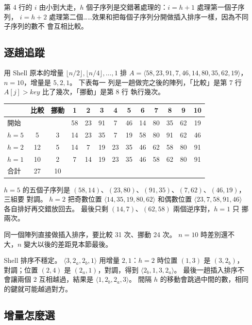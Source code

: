 第 4 行的 $i$ 由小到大走，$h$ 個子序列是交錯著處理的：$i = h + 1$ 處理第一個子序列，
$i = h + 2$ 處理第二個……效果和把每個子序列分開做插入排序一樣，因為不同子序列的數不
會互相比較。

\subsection{逐趟追蹤}

用 Shell 原本的增量 $\lfloor n/2 \rfloor, \lfloor n/4 \rfloor, \ldots, 1$ 排 $A = \langle
58, 23, 91, 7, 46, 14, 80, 35, 62, 19 \rangle$，$n = 10$，增量是 $5, 2, 1$。 下表每一
列是一趟做完之後的陣列，「比較」是第 7 行 $A[j] > \mathit{key}$ 比了幾次，「挪動」是第 8 行
執行幾次。

\begin{center}
\begin{tabular}{lcc*{10}{c}}
\toprule
& 比較 & 挪動 & 1 & 2 & 3 & 4 & 5 & 6 & 7 & 8 & 9 & 10 \\
\midrule
開始 & & & 58 & 23 & 91 & 7 & 46 & 14 & 80 & 35 & 62 & 19 \\
$h = 5$ & 5 & 3 & 14 & 23 & 35 & 7 & 19 & 58 & 80 & 91 & 62 & 46 \\
$h = 2$ & 12 & 5 & 14 & 7 & 19 & 23 & 35 & 46 & 62 & 58 & 80 & 91 \\
$h = 1$ & 10 & 2 & 7 & 14 & 19 & 23 & 35 & 46 & 58 & 62 & 80 & 91 \\
\midrule
合計 & 27 & 10 & \multicolumn{10}{l}{} \\
\bottomrule
\end{tabular}
\end{center}

$h = 5$ 的五個子序列是 $(58, 14)$、$(23, 80)$、$(91, 35)$、$(7, 62)$、$(46, 19)$，三組要
對調。 $h = 2$ 把奇數位置 $\langle 14, 35, 19, 80, 62 \rangle$ 和偶數位置 $\langle 23, 7, 58,
91, 46 \rangle$ 各自排好再交錯放回去。 最後只剩 $(14, 7)$、$(62, 58)$ 兩個逆序對，$h = 1$ 只
挪兩次。

同一個陣列直接做插入排序，要比較 31 次、挪動 24 次。 $n = 10$ 時差別還不
大，$n$ 變大以後的差距見本節最後。

Shell 排序不穩定。 $\langle 3, 2_a, 2_b, 1 \rangle$ 用增量 $2, 1$：$h = 2$ 時位置 $(1, 3)$ 是
$(3, 2_b)$，對調；位置 $(2, 4)$ 是 $(2_a, 1)$，對調，得到 $\langle 2_b, 1, 3, 2_a
\rangle$。 最後一趟插入排序不會讓兩個 $2$ 互相越過，結果是 $\langle 1, 2_b, 2_a, 3
\rangle$。 間隔 $h$ 的移動會跳過中間的數，相同的鍵就可能越過對方。

\subsection{增量怎麼選}

